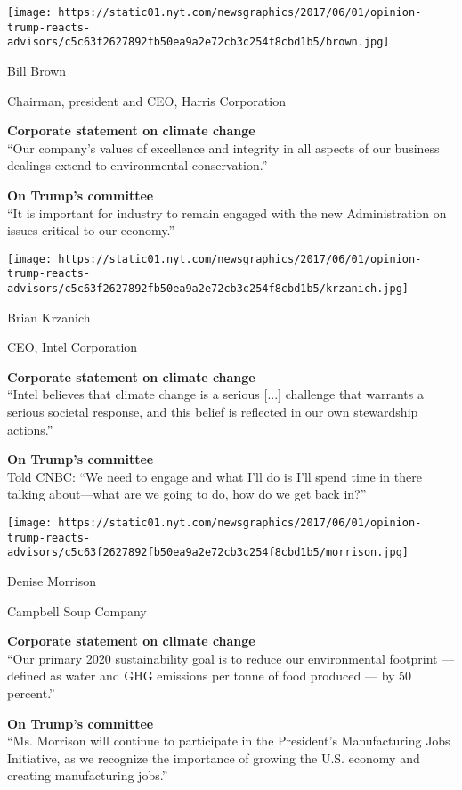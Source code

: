 \texttt{[image: https://static01.nyt.com/newsgraphics/2017/06/01/opinion-trump-reacts-advisors/c5c63f2627892fb50ea9a2e72cb3c254f8cbd1b5/brown.jpg]}

Bill Brown

Chairman, president and CEO, Harris Corporation

\textbf{Corporate statement on climate change}\\
``Our company's values of excellence and integrity in all aspects of our
business dealings extend to environmental conservation.''

\textbf{On Trump's committee}\\
``It is important for industry to remain engaged with the new
Administration on issues critical to our economy.''

\texttt{[image: https://static01.nyt.com/newsgraphics/2017/06/01/opinion-trump-reacts-advisors/c5c63f2627892fb50ea9a2e72cb3c254f8cbd1b5/krzanich.jpg]}

Brian Krzanich

CEO, Intel Corporation

\textbf{Corporate statement on climate change}\\
``Intel believes that climate change is a serious {[}...{]} challenge
that warrants a serious societal response, and this belief is reflected
in our own stewardship actions.''

\textbf{On Trump's committee}\\
Told CNBC: ``We need to engage and what I'll do is I'll spend time in
there talking about---what are we going to do, how do we get back in?''

\texttt{[image: https://static01.nyt.com/newsgraphics/2017/06/01/opinion-trump-reacts-advisors/c5c63f2627892fb50ea9a2e72cb3c254f8cbd1b5/morrison.jpg]}

Denise Morrison

Campbell Soup Company

\textbf{Corporate statement on climate change}\\
``Our primary 2020 sustainability goal is to reduce our environmental
footprint --- defined as water and GHG emissions per tonne of food
produced --- by 50 percent.''

\textbf{On Trump's committee}\\
``Ms. Morrison will continue to participate in the President's
Manufacturing Jobs Initiative, as we recognize the importance of growing
the U.S. economy and creating manufacturing jobs.''

